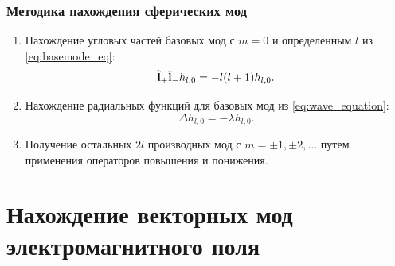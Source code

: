 \documentclass[compress]{beamer}
\begin{document}

    \begin{frame}\frametitle{Методика нахождения сферических мод}

        \begin{enumerate}\justifying
            \item Нахождение угловых частей базовых мод с $m = 0$ и определенным $l$ из \autoref{eq:basemode_eq}:
            \begin{equation*}
                \hat{\mathbf{l}}_{+} \hat{\mathbf{l}}_{-} h_{l, 0} = - l (l + 1) h_{l, 0} .
            \end{equation*}

            \item Нахождение радиальных функций для базовых мод из \autoref{eq:wave_equation}:
            \begin{equation*}
                \Delta h_{l, 0} = - \lambda h_{l, 0} .
            \end{equation*}

            \item Получение остальных $2l$ производных мод с $m = \pm 1, \pm 2, \dots$ путем применения операторов повышения и понижения.

        \end{enumerate}

    \end{frame}


    \section[Моды]{Нахождение векторных мод электромагнитного поля}

\end{document}
